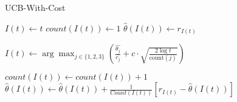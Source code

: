 \documentclass{article}
\begin{document}
\begin{minipage}{10cm}
    \begin{algorithm}[H]
        \caption{UCB-With-Cost}
        \begin{algorithmic}[1]
                \State $I(t) \leftarrow t$
                \State $count(I(t)) \leftarrow 1$
                \State $\hat{\theta}(I(t))\leftarrow r_{I(t)}$
            \EndFor
                
                \State $I(t) \leftarrow\arg\max_{j\in \{1,2,3\}} \left( \frac{\hat{\theta_j}}{c_j} + c\cdot \sqrt{\frac{2\log t}{\mathrm{count}(j)}} \right)$

                \State $count(I(t))\leftarrow count(I(t)) + 1$
                \State $\hat{\theta}(I(t)) \leftarrow \hat{\theta}(I(t))  + \frac{1}{Count(I(t))}\left[
                        r_{I(t)} - \hat{\theta}(I(t))
                    \right]$
            \EndFor
        \end{algorithmic}
    \end{algorithm}
    \end{minipage}

\end{document}

